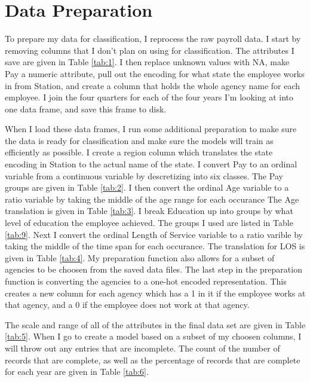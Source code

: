 \documentclass{article}
\begin{document}
\section{Data Preparation}
To prepare my data for classification, I reprocess the raw payroll data. I start by removing columns that I don't plan on using for classification. The attributes I save are given in Table \ref{tab:1}. I then replace unknown values with NA, make Pay a numeric attribute, pull out the encoding for what state the employee works in from Station, and create a column that holds the whole agency name for each employee. I join the four quarters for each of the four years I'm looking at into one data frame, and save this frame to disk.
\par
When I load these data frames, I run some additional preparation to make sure the data is ready for classification and make sure the models will train as efficiently as possible. I create a region column which translates the state encoding in Station to the actual name of the state. I convert Pay to an ordinal variable from a continuous variable by descretizing into six classes. The Pay groups are given in Table \ref{tab:2}. I then convert the ordinal Age variable to a ratio variable by taking the middle of the age range for each occurance The Age translation is given in Table \ref{tab:3}. I break Education up into groups by what level of education the employee achieved. The groups I used are listed in Table \ref{tab:9}. Next I convert the ordinal Length of Service variable to a ratio varible by taking the middle of the time span for each occurance. The translation for LOS is given in Table \ref{tab:4}. My preparation function also allows for a subset of agencies to be choosen from the saved data files. The last step in the preparation function is converting the agencies to a one-hot encoded representation. This creates a new column for each agency which has a 1 in it if the employee works at that agency, and a 0 if the employee does not work at that agency.
\par
The scale and range of all of the attributes in the final data set are given in Table \ref{tab:5}. When I go to create a model based on a subset of my choosen columns, I will throw out any entries that are incomplete. The count of the number of records that are complete, as well as the percentage of records that are complete for each year are given in Table \ref{tab:6}.
\end{document}
